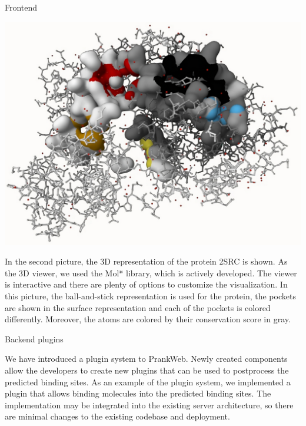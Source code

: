 \documentclass[portrait,a0paper,fontscale=0.25]{baposter}
\begin{document}
\begin{poster}
\begin{posterbox}[column=1, name=result1]{Frontend}
\begin{center}
	\includegraphics[width=0.8\linewidth]{img/molstar.pdf}
\end{center}

In the second picture, the 3D representation of the protein 2SRC is shown.
As the 3D viewer, we used the Mol* library, which is actively developed.
The viewer is interactive and there are plenty of options to customize the visualization.
In this picture, the ball-and-stick representation is used for the protein, the pockets are shown in the surface representation and each of the pockets is colored differently. Moreover, the atoms are colored by their conservation score in gray.

\end{posterbox}

\begin{posterbox}[column=1, name=result2, below=result1,
headerColorOne=violet!90!blue!60, boxColorOne=violet!15]{Backend plugins}

We have introduced a plugin system to PrankWeb. Newly created components allow the developers to create new plugins that can be used to postprocess the predicted binding sites. As an example of the plugin system, we implemented a plugin that allows binding molecules into the predicted binding sites.
The implementation may be integrated into the existing server architecture, so there are minimal changes to the existing codebase and deployment.

\end{posterbox}


\end{poster}
\end{document}
